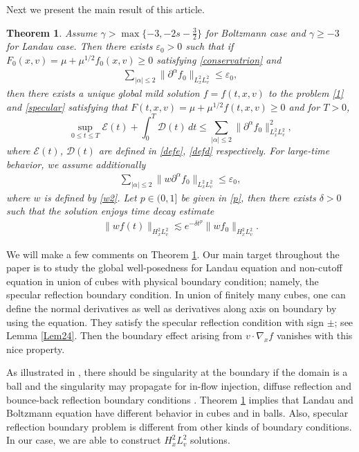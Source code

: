 \documentclass[reqno,a4paper]{amsart}
\newtheorem{Thm}{Theorem}[section]
\numberwithin{equation}{section}
\newcommand{\1}{\mathbf{1}}
\newcommand{\E}{\mathcal{E}}
\newcommand{\D}{\mathcal{D}}
\newcommand{\ve}{\varepsilon}
\newcommand{\pa}{\partial}
\newcommand{\na}{\nabla}
\newcommand{\<}{\langle}
\renewcommand{\>}{\rangle}
\begin{document}
Next we present the main result of this article. 
\begin{Thm}\label{Main}
	Assume $\gamma>\max\{-3,-2s-\frac{3}{2}\}$ for Boltzmann case and $\gamma\ge -3$ for Landau case. Then there exists $\ve_0>0$ such that if $F_0(x,v)=\mu+\mu^{1/2}f_0(x,v)\ge 0$ satisfying \eqref{conservatrion} and
	\begin{align}
		\label{small}
		\sum_{|\alpha|\le 2}\|\pa^\alpha f_0\|_{L^2_xL^2_v}\le \ve_0, 
	\end{align}
	then there exists a unique global mild solution $f=f(t,x,v)$ to the problem \eqref{1} and \eqref{specular} satisfying that $F(t,x,v)=\mu+\mu^{1/2}f(t,x,v)\ge 0$ and for $T>0$, 
	\begin{equation*}
		\sup_{0\le t\le T}\E(t)+\int^T_0\D(t)\,dt\le \sum_{|\alpha|\le 2}\|\pa^\alpha f_0\|^2_{L^2_xL^2_v},
	\end{equation*}
	where $\E(t)$, $\D(t)$ are defined in \eqref{defe}, \eqref{defd} respectively. 
			For large-time behavior, we assume additionally 
			\begin{align}
				\label{small2}
				\sum_{|\alpha|\le 2}\|w\pa^\alpha f_0\|_{L^2_xL^2_v}\le \ve_0,
			\end{align}
		where $w$ is defined by \eqref{w2}. 
		Let $p\in(0,1]$ be given in \eqref{p}, then there exists $\delta>0$ such that the solution enjoys time decay estimate
			\begin{align}\label{timedecay}
				\|{wf}(t)\|_{H^2_xL^2_v} \lesssim e^{-\delta t^p}\|{wf_0 }\|_{H^2_xL^2_v}.
			\end{align}
\end{Thm}
We will make a few comments on Theorem \ref{Main}. Our main target throughout the paper is to study the global well-posedness for Landau equation and non-cutoff equation in union of cubes with physical boundary condition; namely, the specular reflection boundary condition. In union of finitely many cubes, one can define the normal derivatives as well as derivatives along axis on boundary by using the equation. They satisfy the specular reflection condition with sign $\pm$; see Lemma \ref{Lem24}. Then the boundary effect arising from $v\cdot\na_xf$ vanishes with this nice property. 


As illustrated in \cite{Guo2016}, there should be singularity at the boundary if the domain is a ball and the singularity may propagate for in-flow injection, diffuse reflection and bounce-back reflection boundary conditions \cite{Kim2011}. 
Theorem \ref{Main} implies that Landau and Boltzmann equation have different behavior in cubes and in balls. Also, specular reflection boundary problem is different from other kinds of boundary conditions. In our case, we are able to construct $H^2_xL^2_v$ solutions. 
\end{document}
